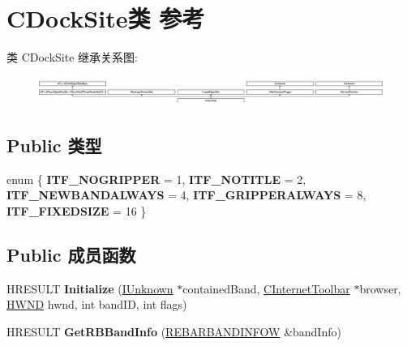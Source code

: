 \hypertarget{class_c_dock_site}{}\section{C\+Dock\+Site类 参考}
\label{class_c_dock_site}
类 C\+Dock\+Site 继承关系图\+:\begin{figure}[H]
\begin{center}
\leavevmode
\includegraphics[height=0.954545cm]{class_c_dock_site}
\end{center}
\end{figure}
\subsection*{Public 类型}
\begin{DoxyCompactItemize}
\item 
\mbox{\label{class_c_dock_site_a8b3879368c634ac660bbcd6025e5098c}} 
enum \{ \newline
{\bfseries I\+T\+F\+\_\+\+N\+O\+G\+R\+I\+P\+P\+ER} = 1, 
{\bfseries I\+T\+F\+\_\+\+N\+O\+T\+I\+T\+LE} = 2, 
{\bfseries I\+T\+F\+\_\+\+N\+E\+W\+B\+A\+N\+D\+A\+L\+W\+A\+YS} = 4, 
{\bfseries I\+T\+F\+\_\+\+G\+R\+I\+P\+P\+E\+R\+A\+L\+W\+A\+YS} = 8, 
\newline
{\bfseries I\+T\+F\+\_\+\+F\+I\+X\+E\+D\+S\+I\+ZE} = 16
 \}
\end{DoxyCompactItemize}
\subsection*{Public 成员函数}
\begin{DoxyCompactItemize}
\item 
\mbox{\label{class_c_dock_site_a7e47a51d3d6ac54bd8f494b9af46da26}} 
H\+R\+E\+S\+U\+LT {\bfseries Initialize} (\hyperlink{interface_i_unknown}{I\+Unknown} $\ast$contained\+Band, \hyperlink{class_c_internet_toolbar}{C\+Internet\+Toolbar} $\ast$browser, \hyperlink{interfacevoid}{H\+W\+ND} hwnd, int band\+ID, int flags)
\item 
\mbox{\label{class_c_dock_site_a273c2a6f0df9542a24b81a576fcb6234}} 
H\+R\+E\+S\+U\+LT {\bfseries Get\+R\+B\+Band\+Info} (\hyperlink{structtag_r_e_b_a_r_b_a_n_d_i_n_f_o_w}{R\+E\+B\+A\+R\+B\+A\+N\+D\+I\+N\+F\+OW} \&band\+Info)
\end{DoxyCompactItemize}
